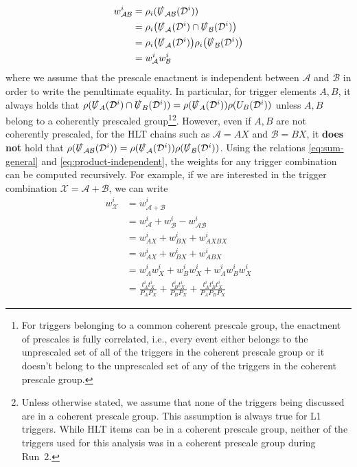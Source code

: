 \begin{align}
\label{eq:product-independent}
    w^i_{\mathcal{A}\mathcal{B}}&=\rho_i(\slashed{U}_\mathcal{AB}(\mathcal{D}^i))\\
    &=\rho_i\big(\slashed{U}_\mathcal{A}(\mathcal{D}^i)\cap \slashed{U}_\mathcal{B}(\mathcal{D}^i)\big)\\
    &=\rho_i\big(\slashed{U}_\mathcal{A}(\mathcal{D}^i)\big)\rho_i\big(\slashed{U}_\mathcal{B}(\mathcal{D}^i)\big)\\
    &=w^i_{\mathcal{A}}w^i_{\mathcal{B}}
\end{align}
where we assume that the prescale enactment is independent between $\mathcal{A}$ and $\mathcal{B}$ in order to write the penultimate equality. %
In particular, for trigger elements $A, B$, it always holds that $\rho(\slashed{U}_A(\mathcal{D}^i)\cap \slashed{U}_B(\mathcal{D}^i))=\rho(\slashed{U}_A(\mathcal{D}^i))\rho(U_B(\mathcal{D}^i))$ unless $A, B$ belong to a coherently prescaled group\footnote{For triggers belonging to a common coherent prescale group, the enactment of prescales is fully correlated, i.e., every event either belongs to the unprescaled set of all of the triggers in the coherent prescale group or it doesn't belong to the unprescaled set of any of the triggers in the coherent prescale group.}\footnote{Unless otherwise stated, we assume that none of the triggers being discussed are in a coherent prescale group. This assumption is always true for L1 triggers. While HLT items can be in a coherent prescale group, neither of the triggers used for this analysis was in a coherent prescale group during Run~2.}. %
However, even if $A, B$ are not coherently prescaled, for the HLT chains such as $\mathcal{A}=AX$ and $\mathcal{B}=BX$, it \textbf{does not} hold that $\rho(\slashed{U}_{\mathcal{A}\mathcal{B}}(\mathcal{D}^i))=\rho(\slashed{U}_{\mathcal{A}}(\mathcal{D}^i))\rho(\slashed{U}_{\mathcal{B}}(\mathcal{D}^i))$. %
Using the relations \ref{eq:sum-general} and \ref{eq:product-independent}, the weights for any trigger combination can be computed recursively. %
For example, if we are interested in the trigger combination $\mathcal{X}=\mathcal{A}+\mathcal{B}$, we can write
\begin{align}
w^i_\mathcal{X}&=w^i_{\mathcal{A}+\mathcal{B}}\\
&=w^i_{\mathcal{A}}+w^i_{\mathcal{B}}-w^i_{\mathcal{AB}}\\
&=w^i_{AX}+w^i_{BX}+w^i_{AXBX}\\
&=w^i_{AX}+w^i_{BX}+w^i_{ABX}\\
&=w^i_A w^i_X+w^i_B w^i_X+w^i_A w^i_B w^i_X\\
&=\frac{t^i_At^i_X}{P_A P_X}+\frac{t^i_Bt^i_X}{P_B P_X}+\frac{t^i_At^i_Bt^i_X}{P_A P_B P_X}
\end{align}

